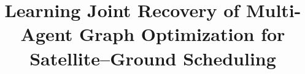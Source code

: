 \documentclass[sigconf,anonymous]{aamas}
\title{Learning Joint Recovery of Multi-Agent Graph Optimization for Satellite--Ground Scheduling}
\begin{document}
\maketitle









\clearpage
\balance


\end{document}

